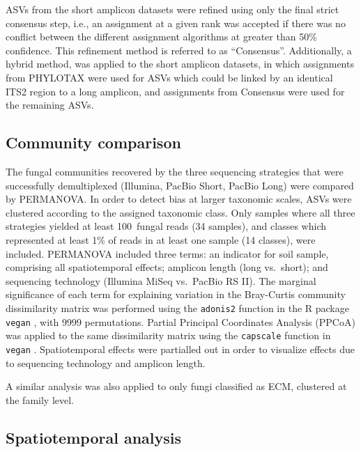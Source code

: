 \documentclass[
  12pt,
]{article}
\begin{document}
ASVs from the short amplicon datasets were refined using only the final strict consensus step, i.e., an assignment at a given rank was accepted if there was no conflict between the different assignment algorithms at greater than 50\% confidence.
This refinement method is referred to as ``Consensus''.
Additionally, a hybrid method, was applied to the short amplicon datasets, in which assignments from PHYLOTAX were used for ASVs which could be linked by an identical ITS2 region to a long amplicon, and assignments from Consensus were used for the remaining ASVs.

\hypertarget{community-comparison}{%
\subsection{Community comparison}\label{community-comparison}}

The fungal communities recovered by the three sequencing strategies that were successfully demultiplexed (Illumina, PacBio Short, PacBio Long) were compared by PERMANOVA.
In order to detect bias at larger taxonomic scales, ASVs were clustered according to the assigned taxonomic class.
Only samples where all three strategies yielded at least 100~fungal reads (34 samples), and classes which represented at least 1\% of reads in at least one sample (14 classes), were included.
PERMANOVA included three terms: an indicator for soil sample, comprising all spatiotemporal effects; amplicon length (long vs.~short); and sequencing technology (Illumina MiSeq vs.~PacBio RS II).
The marginal significance of each term for explaining variation in the Bray-Curtis community dissimilarity matrix was performed using the \texttt{adonis2} function in the R package \texttt{vegan} \autocite{R-vegan}, with 9999 permutations.
Partial Principal Coordinates Analysis (PPCoA) was applied to the same dissimilarity matrix using the \texttt{capscale} function in \texttt{vegan} \autocite{R-vegan}.
Spatiotemporal effects were partialled out in order to visualize effects due to sequencing technology and amplicon length.

A similar analysis was also applied to only fungi classified as ECM, clustered at the family level.

\hypertarget{spatiotemporal-analysis}{%
\subsection{Spatiotemporal analysis}\label{spatiotemporal-analysis}}
\end{document}
